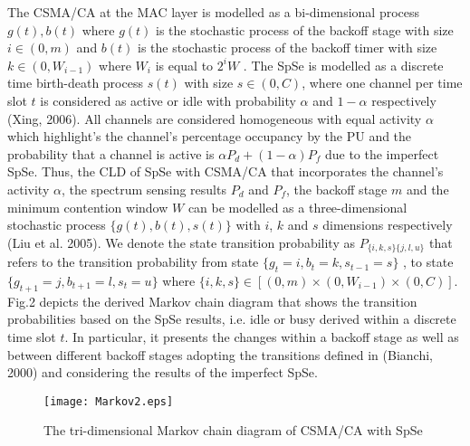 \documentclass
[journal,11pt,draftclsnofoot,onecolumn,doublespace]{tETN2e}
\begin{document}
The CSMA/CA at the MAC layer is modelled as a bi-dimensional process ${g(t),b(t)}$ where $g(t)$ is the stochastic process of the backoff stage with size $i\in(0,m)$ and $b(t)$ is the stochastic process of the backoff timer with size $k\in(0,W_{i-1})$ where $W_i$ is equal to $2^{i}W$ \citep{bianchi00}. The SpSe is modelled as a discrete time birth-death process ${s(t)}$ with size $s\in(0,C)$, where one channel per time slot $t$ is considered as active or idle with probability $\alpha$ and $1−\alpha$ respectively (Xing, 2006). All channels are considered homogeneous with equal activity $\alpha$ which highlight's the channel's percentage occupancy by the PU and the probability that a channel is active is $\alpha P_d+(1-\alpha)P_f$ due to the imperfect SpSe. Thus, the CLD of SpSe with CSMA/CA that incorporates the channel’s activity $\alpha$, the spectrum sensing results $P_d$ and $P_f$, the backoff stage $m$ and the minimum contention window $W$ can be modelled as a three-dimensional stochastic process $\lbrace g(t),b(t),s(t)\rbrace$ with $i$, $k$ and $s$ dimensions respectively (Liu et al. 2005). We denote the state transition probability as $P_{\lbrace i,k,s \rbrace \lbrace j,l,u \rbrace}$ that refers to the transition probability from state $\lbrace g_t=i,b_t=k,s_{t-1}=s \rbrace$ , to state $\lbrace g_{t+1}=j,b_{t+1}=l,s_t=u \rbrace$  where $\lbrace i,k,s \rbrace\in[(0,m)\times(0,W_{i-1})\times(0,C)]$.  Fig.2 depicts the derived Markov chain diagram that shows the transition probabilities based on the SpSe results, i.e. idle or busy derived within a discrete time slot $t$. In particular, it presents the changes within a backoff stage as well as between different backoff stages adopting the transitions defined in (Bianchi, 2000) and considering the results of the imperfect SpSe.

\begin{figure}
\centering
  \texttt{[image: Markov2.eps]}\\
  \caption{The tri-dimensional Markov chain diagram of CSMA/CA with SpSe}
  \label{fig:fig2}
\end{figure}
\end{document}
